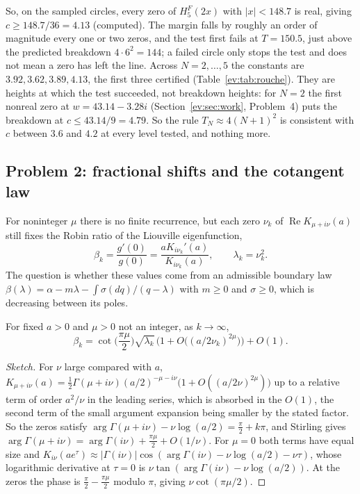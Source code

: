 So, on the sampled circles, every zero of $H^F_5(2x)$ with $|x|<148.7$ is real, giving $c\ge148.7/36=4.13$ (computed). The margin falls by roughly an order of magnitude every one or two zeros, and the test first fails at $T=150.5$, just above the predicted breakdown $4\cdot6^2=144$; a failed circle only stops the test and does not mean a zero has left the line. Across $N=2,\ldots,5$ the constants are $3.92,3.62,3.89,4.13$, the first three certified (Table~\ref{ev:tab:rouche}). They are heights at which the test succeeded, not breakdown heights: for $N=2$ the first nonreal zero at $w=43.14-3.28i$ (Section~\ref{ev:sec:work}, Problem~4) puts the breakdown at $c\le43.14/9=4.79$. So the rule $T_N\approx4(N+1)^2$ is consistent with $c$ between $3.6$ and $4.2$ at every level tested, and nothing more.

\subsection{Problem 2: fractional shifts and the cotangent law}

For noninteger $\mu$ there is no finite recurrence, but each zero $\nu_k$ of $\operatorname{Re}K_{\mu+i\nu}(a)$ still fixes the Robin ratio of the Liouville eigenfunction,
\[
\beta_k=\frac{g'(0)}{g(0)}=\frac{aK_{i\nu_k}'(a)}{K_{i\nu_k}(a)},\qquad\lambda_k=\nu_k^2.
\]
The question is whether these values come from an admissible boundary law $\beta(\lambda)=\alpha-m\lambda-\int\sigma(dq)/(q-\lambda)$ with $m\ge0$ and $\sigma\ge0$, which is decreasing between its poles.

\begin{proposition}\label{ev:prop:cot}
For fixed $a>0$ and $\mu>0$ not an integer, as $k\to\infty$,
\[
\beta_k=\cot\!\Big(\frac{\pi\mu}2\Big)\sqrt{\lambda_k}\,\big(1+O\big((a/2\nu_k)^{2\mu}\big)\big)+O(1).
\]
\end{proposition}

\begin{proof}[Sketch]
For $\nu$ large compared with $a$, $K_{\mu+i\nu}(a)=\tfrac12\Gamma(\mu+i\nu)(a/2)^{-\mu-i\nu}\big(1+O((a/2\nu)^{2\mu})\big)$ up to a relative term of order $a^2/\nu$ in the leading series, which is absorbed in the $O(1)$, the second term of the small argument expansion being smaller by the stated factor. So the zeros satisfy $\arg\Gamma(\mu+i\nu)-\nu\log(a/2)=\tfrac\pi2+k\pi$, and Stirling gives $\arg\Gamma(\mu+i\nu)=\arg\Gamma(i\nu)+\tfrac{\pi\mu}2+O(1/\nu)$. For $\mu=0$ both terms have equal size and $K_{i\nu}(ae^\tau)\approx|\Gamma(i\nu)|\cos(\arg\Gamma(i\nu)-\nu\log(a/2)-\nu\tau)$, whose logarithmic derivative at $\tau=0$ is $\nu\tan(\arg\Gamma(i\nu)-\nu\log(a/2))$. At the zeros the phase is $\tfrac\pi2-\tfrac{\pi\mu}2$ modulo $\pi$, giving $\nu\cot(\pi\mu/2)$.
\end{proof}

